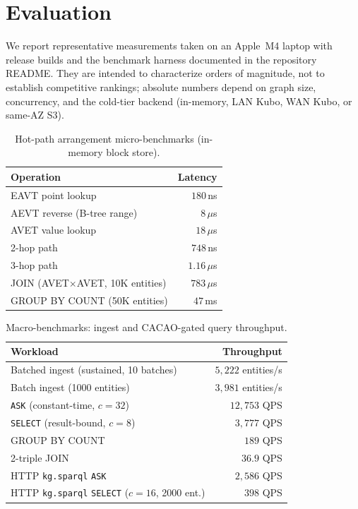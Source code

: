 \documentclass[11pt]{article}
\begin{document}
\section{Evaluation}
\label{sec:eval}

We report representative measurements taken on an Apple~M4 laptop with release
builds and the benchmark harness documented in the repository README. They are
intended to characterize orders of magnitude, not to establish competitive
rankings; absolute numbers depend on graph size, concurrency, and the cold-tier
backend (in-memory, LAN Kubo, WAN Kubo, or same-AZ S3).

\begin{table}[h]
\centering
\small
\caption{Hot-path arrangement micro-benchmarks (in-memory block store).}
\label{tab:hot}
\begin{tabular}{@{}lr@{}}
\toprule
\textbf{Operation} & \textbf{Latency} \\
\midrule
EAVT point lookup            & $180$\,ns \\
AEVT reverse (B-tree range)  & $8\,\mu$s \\
AVET value lookup            & $18\,\mu$s \\
2-hop path                   & $748$\,ns \\
3-hop path                   & $1.16\,\mu$s \\
JOIN (AVET$\times$AVET, 10K entities)   & $783\,\mu$s \\
GROUP BY COUNT (50K entities)           & $47$\,ms \\
\bottomrule
\end{tabular}
\end{table}

\begin{table}[h]
\centering
\small
\caption{Macro-benchmarks: ingest and CACAO-gated query throughput.}
\label{tab:macro}
\begin{tabular}{@{}lr@{}}
\toprule
\textbf{Workload} & \textbf{Throughput} \\
\midrule
Batched ingest (sustained, 10 batches)        & $5{,}222$ entities/s \\
Batch ingest (1000 entities)                  & $3{,}981$ entities/s \\
\texttt{ASK} (constant-time, $c{=}32$)        & $12{,}753$ QPS \\
\texttt{SELECT} (result-bound, $c{=}8$)       & $3{,}777$ QPS \\
GROUP BY COUNT                                & $189$ QPS \\
2-triple JOIN                                 & $36.9$ QPS \\
HTTP \texttt{kg.sparql} \texttt{ASK}          & $2{,}586$ QPS \\
HTTP \texttt{kg.sparql} \texttt{SELECT} ($c{=}16$, 2000 ent.) & $398$ QPS \\
\bottomrule
\end{tabular}
\end{table}
\end{document}
